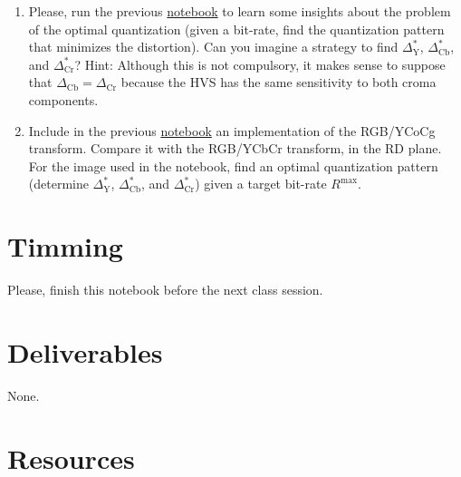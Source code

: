 \begin{enumerate}
\item Please, run the previous
  \href{https://github.com/Sistemas-Multimedia/Sistemas-Multimedia.github.io/blob/master/study_guide/06-color_transform/performance.ipynb}{notebook}
  to learn some insights about the problem of the optimal quantization
  (given a bit-rate, find the quantization pattern that minimizes the
  distortion). Can you imagine a strategy to find
  $\Delta^*_{\text{Y}}$, $\Delta^*_{\text{Cb}}$, and
  $\Delta^*_{\text{Cr}}$? Hint: Although this is not compulsory, it
  makes sense to suppose that
  $\Delta_{\text{Cb}} = \Delta_{\text{Cr}}$ because the HVS has the
  same sensitivity to both croma components.
\item Include in the previous
  \href{https://github.com/Sistemas-Multimedia/Sistemas-Multimedia.github.io/blob/master/study_guide/06-color_transform/performance.ipynb}{notebook}
  an implementation of the RGB/YCoCg transform. Compare it with the
  RGB/YCbCr transform, in the RD plane. For the image used in the
  notebook, find an optimal quantization pattern (determine
  $\Delta^*_{\text{Y}}$, $\Delta^*_{\text{Cb}}$, and
  $\Delta^*_{\text{Cr}}$) given a target bit-rate $R^{\text{max}}$.
\end{enumerate}

\section{Timming}

Please, finish this notebook before the next class session.

\section{Deliverables}

None.

\section{Resources}


